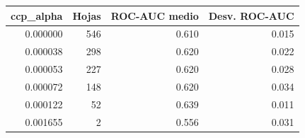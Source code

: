 \begin{tabular}{rrrr}
\toprule
ccp\_alpha & Hojas & ROC-AUC medio & Desv. ROC-AUC \\
\midrule
0.000000 & 546 & 0.610 & 0.015 \\
0.000038 & 298 & 0.620 & 0.022 \\
0.000053 & 227 & 0.620 & 0.028 \\
0.000072 & 148 & 0.620 & 0.034 \\
0.000122 & 52 & 0.639 & 0.011 \\
0.001655 & 2 & 0.556 & 0.031 \\
\bottomrule
\end{tabular}
